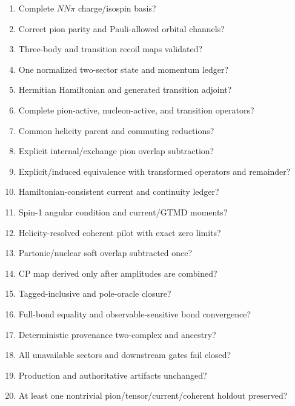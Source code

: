 \documentclass[11pt]{article}
\begin{document}
\begin{enumerate}
\item Complete \(NN\pi\) charge/isospin basis?
\item Correct pion parity and Pauli-allowed orbital channels?
\item Three-body and transition recoil maps validated?
\item One normalized two-sector state and momentum ledger?
\item Hermitian Hamiltonian and generated transition adjoint?
\item Complete pion-active, nucleon-active, and transition operators?
\item Common helicity parent and commuting reductions?
\item Explicit internal/exchange pion overlap subtraction?
\item Explicit/induced equivalence with transformed operators and remainder?
\item Hamiltonian-consistent current and continuity ledger?
\item Spin-1 angular condition and current/GTMD moments?
\item Helicity-resolved coherent pilot with exact zero limits?
\item Partonic/nuclear soft overlap subtracted once?
\item CP map derived only after amplitudes are combined?
\item Tagged-inclusive and pole-oracle closure?
\item Full-bond equality and observable-sensitive bond convergence?
\item Deterministic provenance two-complex and ancestry?
\item All unavailable sectors and downstream gates fail closed?
\item Production and authoritative artifacts unchanged?
\item At least one nontrivial pion/tensor/current/coherent holdout preserved?
\end{enumerate}
\end{document}
